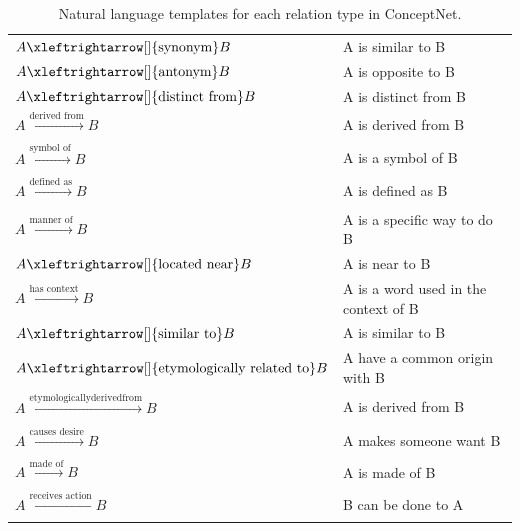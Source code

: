 \begin{table}[!hb]
\begin{tabular}{ll}
    $A \xleftrightarrow[]{\text{synonym}} B$ & A is similar to B \\
    $A \xleftrightarrow[]{\text{antonym}} B$ & A is opposite to B \\
    $A \xleftrightarrow[]{\text{distinct from}} B$ & A is distinct from B \\
    $A \xrightarrow[]{\text{derived from}} B$ & A is derived from B \\
    $A \xrightarrow[]{\text{symbol of}} B$ & A is a symbol of B \\
    $A \xrightarrow[]{\text{defined as}} B$ & A is defined as B \\
    $A \xrightarrow[]{\text{manner of}} B$ & A is a specific way to do B \\
    $A \xleftrightarrow[]{\text{located near}} B$ & A is near to B \\
    $A \xrightarrow[]{\text{has context}} B$ & A is a word used in the context of B \\
    $A \xleftrightarrow[]{\text{similar to}} B$ & A is similar to B \\
    $A \xleftrightarrow[]{\text{etymologically related to}} B$ & A have a common origin with B \\
    $A \xrightarrow[]{\text{etymologicallyderivedfrom}} B$ & A is derived from B \\
    $A \xrightarrow[]{\text{causes desire}} B$ & A makes someone want B \\
    $A \xrightarrow[]{\text{made of}} B$ & A is made of B \\
    $A \xleftarrow[]{\text{receives action}} B$ & B can be done to A \\
    \bottomrule
    \end{tabular}
    \caption{Natural language templates for each relation type in ConceptNet.}
    \label{tab:converted_relation}
\end{table}